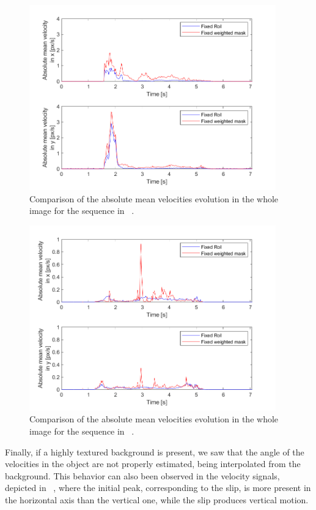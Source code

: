 \begin{figure}[H]
    \centering
    \includegraphics[width=0.95\textwidth]{resources/images/OF_comparison_set_rev}
    \caption{Comparison of the absolute mean velocities evolution in the whole image for the sequence in ~.}\label{fig:OF_comparison_set_rev}
\end{figure}

\begin{figure}[H]
    \centering
    \includegraphics[width=0.95\textwidth]{resources/images/OF_comparison_hb1}
    \caption{Comparison of the absolute mean velocities evolution in the whole image for the sequence in ~.}\label{fig:OF_comparison_hb1}
\end{figure}

Finally, if a highly textured background is present, we saw that the angle of the velocities in the object are not properly estimated, being interpolated from the background. This behavior can also been observed in the velocity signals, depicted in ~, where the initial peak, corresponding to the slip, is more present in the horizontal axis than the vertical one, while the slip produces vertical motion.


